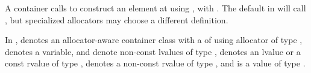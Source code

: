 \begin{note}
A container calls 
to construct an element at  using ,
with .
The default  in  will
call ,
but specialized allocators may choose a different definition.
\end{note}

\pnum
In ,  denotes an allocator-aware container class
with a  of  using allocator of type ,  denotes a
variable,
 and  denote non-const lvalues of type ,
 denotes an lvalue or a const rvalue of type ,  denotes a
non-const rvalue of type , and  is a value of type .

